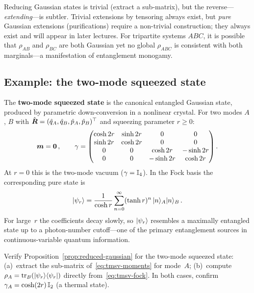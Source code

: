 \begin{remark}
  Reducing Gaussian states is trivial (extract a sub-matrix), but the
  reverse---\emph{extending}---is subtler.  Trivial extensions by
  tensoring always exist, but \emph{pure} Gaussian extensions
  (purifications) require a non-trivial construction; they always exist
  and will appear in later lectures.  For tripartite systems $ABC$, it
  is possible that $\rho_{AB}$ and $\rho_{BC}$ are both Gaussian yet
  no global $\rho_{ABC}$ is consistent with both marginals---a
  manifestation of entanglement monogamy.
\end{remark}

\subsection{Example: the two-mode squeezed state}%
\label{sec:two-mode-squeezed}

The \textbf{two-mode squeezed state} is the canonical entangled
Gaussian state, produced by parametric down-conversion in a nonlinear
crystal.  For two modes $A$, $B$ with
$\hat{\boldsymbol{R}} = (\hat{q}_A, \hat{q}_B, \hat{p}_A, \hat{p}_B)^\top$
and squeezing parameter $r \geq 0$:
\begin{equation}\label{eq:tmsv-moments}
  \boldsymbol{m} = \boldsymbol{0}\,,\qquad
  \gamma =
  \begin{pmatrix}
    \cosh 2r & \sinh 2r & 0 & 0 \\
    \sinh 2r & \cosh 2r & 0 & 0 \\
    0 & 0 & \cosh 2r & -\sinh 2r \\
    0 & 0 & -\sinh 2r & \cosh 2r
  \end{pmatrix}.
\end{equation}
At $r = 0$ this is the two-mode vacuum ($\gamma = \mathbb{I}_4$).
In the Fock basis the corresponding pure state is
\begin{equation}\label{eq:tmsv-fock}
  \lvert \psi_r \rangle
  = \frac{1}{\cosh r}\sum_{n=0}^{\infty}
    (\tanh r)^n\,\lvert n \rangle_A\lvert n \rangle_B\,.
\end{equation}
For large~$r$ the coefficients decay slowly, so $\lvert \psi_r \rangle$
resembles a maximally entangled state up to a photon-number
cutoff---one of the primary entanglement sources in continuous-variable
quantum information.

\begin{exercise}\label{ex:tmsv-reduced}
  Verify Proposition~\ref{prop:reduced-gaussian} for the two-mode
  squeezed state: (a)~extract the sub-matrix of~\eqref{eq:tmsv-moments}
  for mode~$A$; (b)~compute
  $\rho_A = \operatorname{tr}_B(\lvert \psi_r \rangle\langle \psi_r \rvert)$ directly
  from~\eqref{eq:tmsv-fock}.  In both cases, confirm
  $\gamma_A = \cosh(2r)\,\mathbb{I}_2$ (a thermal state).
\end{exercise}
